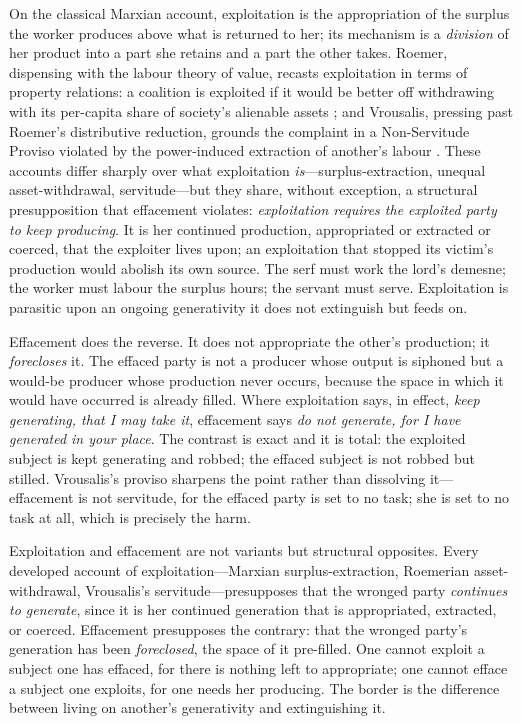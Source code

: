 On the classical Marxian account, exploitation is the appropriation of the surplus the worker produces above what is returned to her; its mechanism is a \emph{division} of her product into a part she retains and a part the other takes. Roemer, dispensing with the labour theory of value, recasts exploitation in terms of property relations: a coalition is exploited if it would be better off withdrawing with its per-capita share of society's alienable assets \parencite{roemer1982}; and Vrousalis, pressing past Roemer's distributive reduction, grounds the complaint in a Non-Servitude Proviso violated by the power-induced extraction of another's labour \parencite{vrousalis2021}. These accounts differ sharply over what exploitation \emph{is}---surplus-extraction, unequal asset-withdrawal, servitude---but they share, without exception, a structural presupposition that effacement violates: \emph{exploitation requires the exploited party to keep producing}. It is her continued production, appropriated or extracted or coerced, that the exploiter lives upon; an exploitation that stopped its victim's production would abolish its own source. The serf must work the lord's demesne; the worker must labour the surplus hours; the servant must serve. Exploitation is parasitic upon an ongoing generativity it does not extinguish but feeds on.

Effacement does the reverse. It does not appropriate the other's production; it \emph{forecloses} it. The effaced party is not a producer whose output is siphoned but a would-be producer whose production never occurs, because the space in which it would have occurred is already filled. Where exploitation says, in effect, \emph{keep generating, that I may take it}, effacement says \emph{do not generate, for I have generated in your place}. The contrast is exact and it is total: the exploited subject is kept generating and robbed; the effaced subject is not robbed but stilled. Vrousalis's proviso sharpens the point rather than dissolving it---effacement is not servitude, for the effaced party is set to no task; she is set to no task at all, which is precisely the harm.

\begin{claim}
Exploitation and effacement are not variants but structural opposites. Every developed account of exploitation---Marxian surplus-extraction, Roemerian asset-withdrawal, Vrousalis's servitude---presupposes that the wronged party \emph{continues to generate}, since it is her continued generation that is appropriated, extracted, or coerced. Effacement presupposes the contrary: that the wronged party's generation has been \emph{foreclosed}, the space of it pre-filled. One cannot exploit a subject one has effaced, for there is nothing left to appropriate; one cannot efface a subject one exploits, for one needs her producing. The border is the difference between living on another's generativity and extinguishing it.
\end{claim}

